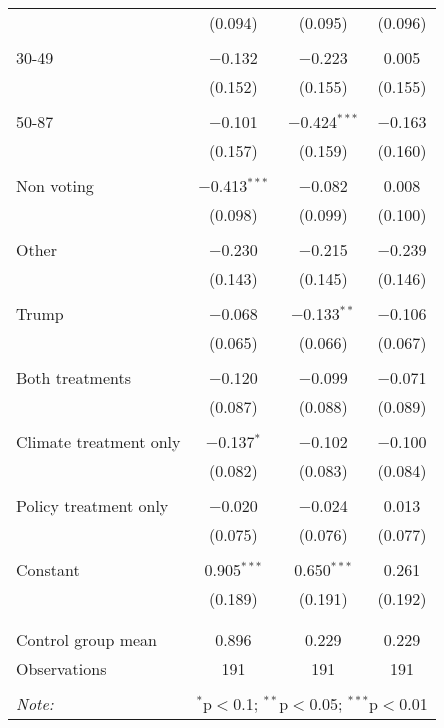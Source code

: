 \begin{tabular}{@{\extracolsep{5pt}}lccc}
  & (0.094) & (0.095) & (0.096) \\ 
  & & & \\ 
 30-49 & $-$0.132 & $-$0.223 & 0.005 \\ 
  & (0.152) & (0.155) & (0.155) \\ 
  & & & \\ 
 50-87 & $-$0.101 & $-$0.424$^{***}$ & $-$0.163 \\ 
  & (0.157) & (0.159) & (0.160) \\ 
  & & & \\ 
 Non voting & $-$0.413$^{***}$ & $-$0.082 & 0.008 \\ 
  & (0.098) & (0.099) & (0.100) \\ 
  & & & \\ 
 Other & $-$0.230 & $-$0.215 & $-$0.239 \\ 
  & (0.143) & (0.145) & (0.146) \\ 
  & & & \\ 
 Trump & $-$0.068 & $-$0.133$^{**}$ & $-$0.106 \\ 
  & (0.065) & (0.066) & (0.067) \\ 
  & & & \\ 
 Both treatments & $-$0.120 & $-$0.099 & $-$0.071 \\ 
  & (0.087) & (0.088) & (0.089) \\ 
  & & & \\ 
 Climate treatment only & $-$0.137$^{*}$ & $-$0.102 & $-$0.100 \\ 
  & (0.082) & (0.083) & (0.084) \\ 
  & & & \\ 
 Policy treatment only & $-$0.020 & $-$0.024 & 0.013 \\ 
  & (0.075) & (0.076) & (0.077) \\ 
  & & & \\ 
 Constant & 0.905$^{***}$ & 0.650$^{***}$ & 0.261 \\ 
  & (0.189) & (0.191) & (0.192) \\ 
  & & & \\ 
\hline \\[-1.8ex] 
Control group mean & 0.896 & 0.229 & 0.229 \\ 
Observations & 191 & 191 & 191 \\ 
\hline 
\hline \\[-1.8ex] 
\textit{Note:}  & \multicolumn{3}{r}{$^{*}$p$<$0.1; $^{**}$p$<$0.05; $^{***}$p$<$0.01} \\ 
\end{tabular} 
